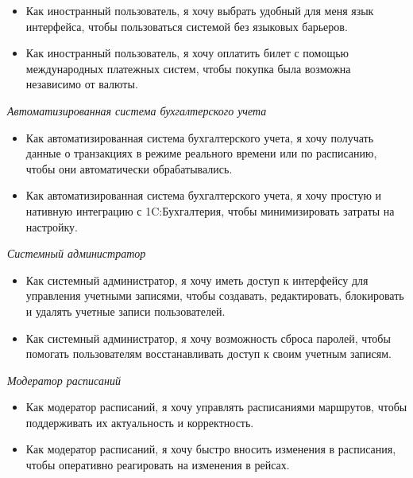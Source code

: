 \begin{itemize}
    \item Как иностранный пользователь, я хочу выбрать удобный для меня язык интерфейса, чтобы пользоваться системой без языковых барьеров.
    \item Как иностранный пользователь, я хочу оплатить билет с помощью международных платежных систем, чтобы покупка была возможна независимо от валюты.
\end{itemize}

\begin{center}
    \textit{Автоматизированная система бухгалтерского учета}
\end{center}

\begin{itemize}
    \item Как автоматизированная система бухгалтерского учета, я хочу получать данные о транзакциях в режиме реального времени или по расписанию, чтобы они автоматически обрабатывались.
    \item Как автоматизированная система бухгалтерского учета, я хочу простую и нативную интеграцию с 1C:Бухгалтерия, чтобы минимизировать затраты на настройку.
\end{itemize}

\begin{center}
    \textit{Системный администратор}
\end{center}

\begin{itemize}
    \item Как системный администратор, я хочу иметь доступ к интерфейсу для управления учетными записями, чтобы создавать, редактировать, блокировать и удалять учетные записи пользователей.
    \item Как системный администратор, я хочу возможность сброса паролей, чтобы помогать пользователям восстанавливать доступ к своим учетным записям.
\end{itemize}

\begin{center}
    \textit{Модератор расписаний}
\end{center}

\begin{itemize}
    \item Как модератор расписаний, я хочу управлять расписаниями маршрутов, чтобы поддерживать их актуальность и корректность.
    \item Как модератор расписаний, я хочу быстро вносить изменения в расписания, чтобы оперативно реагировать на изменения в рейсах.
\end{itemize}
